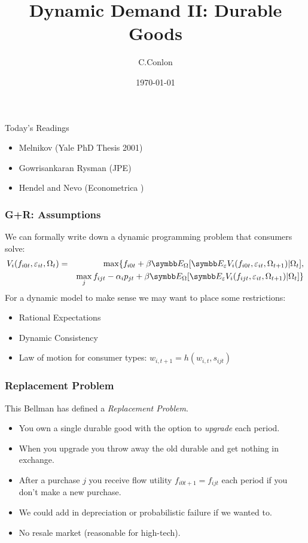 \documentclass[aspectratio=169,11pt]{beamer}
\title [Dynamic Demand II]{Dynamic Demand II:
 Durable Goods }
\author{C.Conlon}
\institute{Grad IO}
\date{\today}
\begin{document}
\maketitle

\begin{frame}{Today's Readings}
\begin{itemize}
\item Melnikov (Yale PhD Thesis 2001)
\item Gowrisankaran Rysman (JPE)
\item Hendel and Nevo (Econometrica )
\end{itemize}
\end{frame}


\begin{frame}
\frametitle{G+R: Assumptions}
 We can formally write down a dynamic programming problem that consumers solve:
\begin{eqnarray*}
V_i(f_{i0t},\varepsilon_{i t}, \Omega_t) &=& \max \{ f_{i0t} + \beta \E_{\Omega}[ \E_{\varepsilon} V_i (f_{i0t}, \varepsilon_{it}, \Omega_{t+1}) |\Omega_{t} ] ,\\
&& \max_j f_{ijt}  -\alpha_i p_{jt} + \beta \E_{\Omega}[ \E_{\varepsilon} V_i (f_{ijt}, \varepsilon_{it}, \Omega_{t+1}) |\Omega_{t} ]  \}
\end{eqnarray*}
For a dynamic model to make sense we may want to place some restrictions:
\begin{itemize}
\item Rational Expectations
\item Dynamic Consistency
\item Law of motion for consumer types: $w_{i,t+1} =h(w_{i,t},s_{ijt})$ 
\end{itemize}
\end{frame}

\begin{frame}
\frametitle{Replacement Problem}
This Bellman has defined a \textit{Replacement Problem}.
\begin{itemize}
\item You own a single durable good with the option to \textit{upgrade} each period.
\item When you upgrade \alert{you throw away the old durable and get nothing in exchange}.
\item After a purchase $j$  you receive flow utility $f_{i0t+1} = f_{ijt}$ each period if you don't make a new purchase.
\item We could add in depreciation or probabilistic failure if we wanted to.
\item No resale market (reasonable for high-tech).
\end{itemize}
\end{frame}
\end{document}
